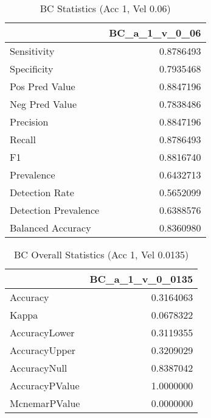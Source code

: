 \documentclass[]{article}
\begin{document}
\begin{table}[!h]

\caption{\label{tab:bc_accuracy_chunk}BC Statistics (Acc 1, Vel 0.06)}
\centering
\begin{tabular}[t]{lr}
\toprule
  & BC\_a\_1\_v\_0\_06\\
\midrule
Sensitivity & 0.8786493\\
Specificity & 0.7935468\\
Pos Pred Value & 0.8847196\\
Neg Pred Value & 0.7838486\\
Precision & 0.8847196\\
\addlinespace
Recall & 0.8786493\\
F1 & 0.8816740\\
Prevalence & 0.6432713\\
Detection Rate & 0.5652099\\
Detection Prevalence & 0.6388576\\
Balanced Accuracy & 0.8360980\\
\bottomrule
\end{tabular}
\end{table}

\begin{table}[!h]

\caption{\label{tab:bc_accuracy_chunk}BC Overall Statistics (Acc 1, Vel 0.0135)}
\centering
\begin{tabular}[t]{lr}
\toprule
  & BC\_a\_1\_v\_0\_0135\\
\midrule
Accuracy & 0.3164063\\
Kappa & 0.0678322\\
AccuracyLower & 0.3119355\\
AccuracyUpper & 0.3209029\\
AccuracyNull & 0.8387042\\
\addlinespace
AccuracyPValue & 1.0000000\\
McnemarPValue & 0.0000000\\
\bottomrule
\end{tabular}
\end{table}
\end{document}
